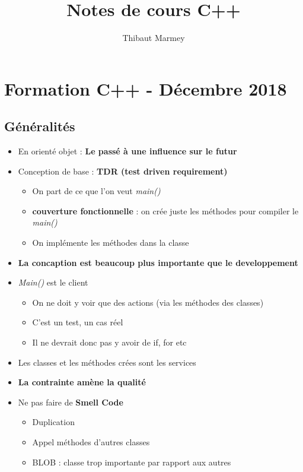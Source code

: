 \documentclass[12pt,a4paper]{article}
\author{Thibaut Marmey}
\title{Notes de cours C++}
\begin{document}
	\maketitle

\begin{normalsize}
\tableofcontents
\end{normalsize}

\section{Formation C++ - Décembre 2018}
\subsection{Généralités}
\begin{itemize}
\item En orienté objet : \textbf{Le passé à une influence sur le futur}
\item Conception de base : \textbf{TDR (test driven requirement)}
\begin{itemize}
\item On part de ce que l'on veut \textit{main()}
\item\textbf{couverture fonctionnelle} : on crée juste les méthodes pour compiler le \textit{main()}
\item On implémente les méthodes dans la classe
\end{itemize}
\item \textbf{La concaption est beaucoup plus importante que le developpement}
\item \textit{Main()} est le client
\begin{itemize}
\item On ne doit y voir que des actions (via les méthodes des classes)
\item C'est un test, un cas réel
\item Il ne devrait donc pas y avoir de if, for etc
\end{itemize}
\item Les classes et les méthodes crées sont les services
\item \textbf{La contrainte amène la qualité}
\item Ne pas faire de \textbf{Smell Code}
\begin{itemize}
\item Duplication
\item Appel méthodes d'autres classes
\item BLOB : classe trop importante par rapport aux autres

\end{itemize}
\end{itemize}
\end{document}
